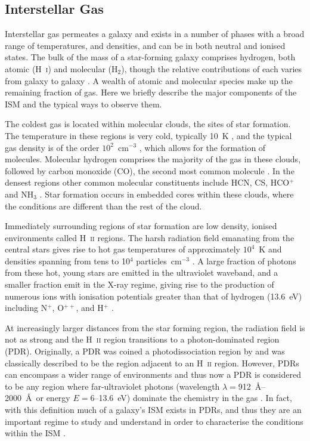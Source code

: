 \subsection{Interstellar Gas} \label{gas}
Interstellar gas permeates a galaxy and exists in a number of phases with a broad range of temperatures, and densities, and can be in both neutral and ionised states.  The bulk of the mass of a star-forming galaxy comprises hydrogen, both atomic (H~\textsc{i}) and molecular (H$_{2}$), though the relative contributions of each varies from galaxy to galaxy \citep{1989ApJ...347L..55Y,2002A&A...384...33B, 2009MNRAS.394.1857O}.  A wealth of atomic and molecular species make up the remaining fraction of gas.  Here we briefly describe the major components of the ISM and the typical ways to observe them.

The coldest gas is located within molecular clouds, the sites of star formation.  The temperature in these regions is very cold, typically 10~K \citep{1991ARA&A..29..581Y}, and the typical gas density is of the order $10^{2}$~cm$^{-3}$ \citep{2012arXiv1210.6990S}, which allows for the formation of molecules.  Molecular hydrogen comprises the majority of the gas in these clouds, followed by carbon monoxide (CO), the second most common molecule \citep[e.g.][]{1982ApJ...262..590F}.  In the densest regions other common molecular constituents include HCN, CS, HCO$^{+}$ and NH$_{3}$ \citep{2005pcim.book.....T,2007ARA&A..45..339B,2012arXiv1210.6990S}.  Star formation occurs in embedded cores within these clouds, where the conditions are different than the rest of the cloud.

Immediately surrounding regions of star formation are low density, ionised environments called H~\textsc{ii} regions.  The harsh radiation field emanating from the central stars gives rise to hot gas temperatures of approximately $10^{4}$~K \citep{1985ApJS...57..349R, 2005pcim.book.....T} and densities spanning from tens to 10$^{4}$ particles~cm$^{-3}$ \citep{2005pcim.book.....T}.  A large fraction of photons from these hot, young stars are emitted in the ultraviolet waveband, and a smaller fraction emit in the X-ray regime, giving rise to the production of numerous ions with ionisation potentials greater than that of hydrogen (13.6~eV) including N$^{+}$, O$^{++}$, and H$^{+}$ \citep{2005pcim.book.....T}.

At increasingly larger distances from the star forming region, the radiation field is not as strong and the H~\textsc{ii} region transitions to a photon-dominated region (PDR).  Originally, a PDR was coined a photodissociation region by \citet{1985ApJ...291..722T} and was classically described to be the region adjacent to an H~\textsc{ii} region.  However, PDRs can encompass a wider range of environments and thus now a PDR is considered to be any region where far-ultraviolet photons (wavelength $\lambda = $912~\AA -- 2000~\AA ~or energy $E = $6--13.6~eV) dominate the chemistry in the gas \citep{1985ApJ...291..722T, 1991ApJ...377..192H}.  In fact, with this definition much of a galaxy's ISM exists in PDRs, and thus they are an important regime to study and understand in order to characterise the conditions within the ISM \citep{1985ApJ...291..722T}.

